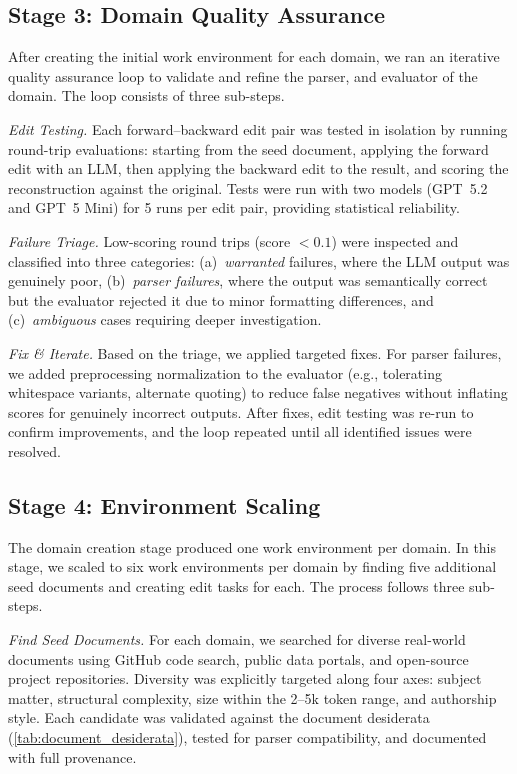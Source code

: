 \documentclass{article} %
\begin{document}
\subsection{Stage 3: Domain Quality Assurance} \label{app:domain_qa}
After creating the initial work environment for each domain, we ran an iterative quality assurance loop to validate and refine the parser, and evaluator of the domain. The loop consists of three sub-steps.

\textit{Edit Testing.} Each forward--backward edit pair was tested in isolation by running round-trip evaluations: starting from the seed document, applying the forward edit with an LLM, then applying the backward edit to the result, and scoring the reconstruction against the original. Tests were run with two models (GPT~5.2 and GPT~5 Mini) for 5 runs per edit pair, providing statistical reliability.

\textit{Failure Triage.} Low-scoring round trips (score $< 0.1$) were inspected and classified into three categories: (a)~\textit{warranted} failures, where the LLM output was genuinely poor, (b)~\textit{parser failures}, where the output was semantically correct but the evaluator rejected it due to minor formatting differences, and (c)~\textit{ambiguous} cases requiring deeper investigation.

\textit{Fix \& Iterate.} Based on the triage, we applied targeted fixes. For parser failures, we added preprocessing normalization to the evaluator (e.g., tolerating whitespace variants, alternate quoting) to reduce false negatives without inflating scores for genuinely incorrect outputs. After fixes, edit testing was re-run to confirm improvements, and the loop repeated until all identified issues were resolved.

\subsection{Stage 4: Environment Scaling} \label{app:env_scaling}
The domain creation stage produced one work environment per domain. In this stage, we scaled to six work environments per domain by finding five additional seed documents and creating edit tasks for each. The process follows three sub-steps.

\textit{Find Seed Documents.} For each domain, we searched for diverse real-world documents using GitHub code search, public data portals, and open-source project repositories. Diversity was explicitly targeted along four axes: subject matter, structural complexity, size within the 2--5k token range, and authorship style. Each candidate was validated against the document desiderata (\autoref{tab:document_desiderata}), tested for parser compatibility, and documented with full provenance.
\end{document}
